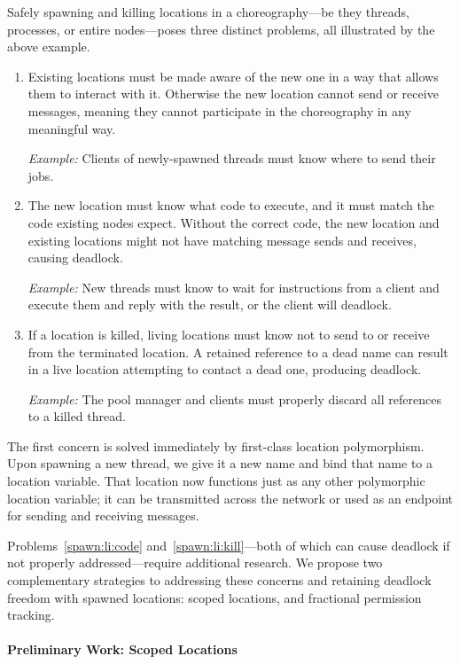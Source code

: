 Safely spawning and killing locations in a choreography---be they threads, processes, or entire nodes---poses three distinct problems,
all illustrated by the above example.
\begin{enumerate}
  \item\label{spawn:li:name}
    Existing locations must be made aware of the new one in a way that allows them to interact with it.
    Otherwise the new location cannot send or receive messages, meaning they cannot participate in the choreography in any meaningful way.

    \textit{Example:} Clients of newly-spawned threads must know where to send their jobs.
  \item\label{spawn:li:code}
    The new location must know what code to execute, and it must match the code existing nodes expect.
    Without the correct code, the new location and existing locations might not have matching message sends and receives, causing deadlock.

    \textit{Example:} New threads must know to wait for instructions from a client and execute them
    and reply with the result, or the client will deadlock.
  \item\label{spawn:li:kill}
    If a location is killed, living locations must know not to send to or receive from the terminated location.
    A retained reference to a dead name can result in a live location attempting to contact a dead one, producing deadlock.

    \textit{Example:} The pool manager and clients must properly discard all references to a killed thread.
\end{enumerate}

The first concern is solved immediately by first-class location polymorphism.
Upon spawning a new thread, we give it a new name and bind that name to a location variable.
That location now functions just as any other polymorphic location variable;
it can be transmitted across the network or used as an endpoint for sending and receiving messages.

Problems~\ref{spawn:li:code} and~\ref{spawn:li:kill}---both of which can cause deadlock if not properly addressed---require additional research.
We propose two complementary strategies to addressing these concerns and retaining deadlock freedom with spawned locations:
scoped locations, and fractional permission tracking.

\paragraph{Preliminary Work: Scoped Locations}

